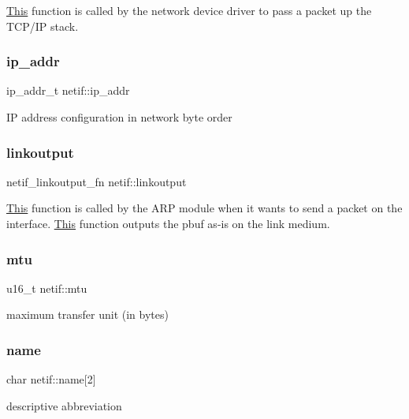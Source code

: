 \hyperlink{namespace_this}{This} function is called by the network device driver to pass a packet up the T\+C\+P/\+IP stack. \mbox{\label{structnetif_a9776aaee37ea8f07b9ddc0f8b4e7e866}} 
\subsubsection{\texorpdfstring{ip\+\_\+addr}{ip\_addr}}
{\footnotesize\ttfamily ip\+\_\+addr\+\_\+t netif\+::ip\+\_\+addr}

IP address configuration in network byte order \mbox{\label{structnetif_acaaac9b415a7be73eb8a287c8ed18a8d}} 
\subsubsection{\texorpdfstring{linkoutput}{linkoutput}}
{\footnotesize\ttfamily netif\+\_\+linkoutput\+\_\+fn netif\+::linkoutput}

\hyperlink{namespace_this}{This} function is called by the A\+RP module when it wants to send a packet on the interface. \hyperlink{namespace_this}{This} function outputs the pbuf as-\/is on the link medium. \mbox{\label{structnetif_aca7d56b4e0f822b0ced2885f222b8d48}} 
\subsubsection{\texorpdfstring{mtu}{mtu}}
{\footnotesize\ttfamily u16\+\_\+t netif\+::mtu}

maximum transfer unit (in bytes) \mbox{\label{structnetif_a32fca6ffd28bb9af3f891a378827a67e}} 
\subsubsection{\texorpdfstring{name}{name}}
{\footnotesize\ttfamily char netif\+::name\mbox{[}2\mbox{]}}

descriptive abbreviation \mbox{\label{structnetif_ae77736b64df442242795220d76be6b86}} 
